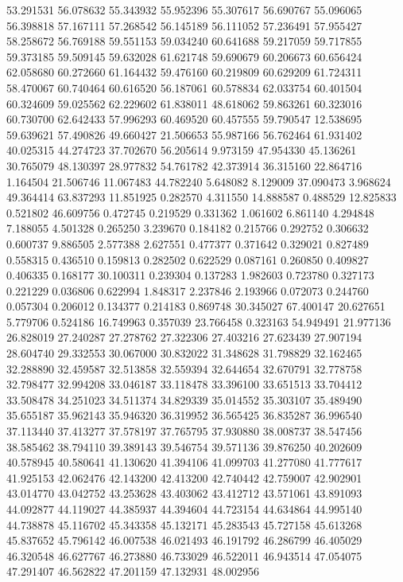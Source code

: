 53.291531
56.078632
55.343932
55.952396
55.307617
56.690767
55.096065
56.398818
57.167111
57.268542
56.145189
56.111052
57.236491
57.955427
58.258672
56.769188
59.551153
59.034240
60.641688
59.217059
59.717855
59.373185
59.509145
59.632028
61.621748
59.690679
60.206673
60.656424
62.058680
60.272660
61.164432
59.476160
60.219809
60.629209
61.724311
58.470067
60.740464
60.616520
56.187061
60.578834
62.033754
60.401504
60.324609
59.025562
62.229602
61.838011
48.618062
59.863261
60.323016
60.730700
62.642433
57.996293
60.469520
60.457555
59.790547
12.538695
59.639621
57.490826
49.660427
21.506653
55.987166
56.762464
61.931402
40.025315
44.274723
37.702670
56.205614
9.973159
47.954330
45.136261
30.765079
48.130397
28.977832
54.761782
42.373914
36.315160
22.864716
1.164504
21.506746
11.067483
44.782240
5.648082
8.129009
37.090473
3.968624
49.364414
63.837293
11.851925
0.282570
4.311550
14.888587
0.488529
12.825833
0.521802
46.609756
0.472745
0.219529
0.331362
1.061602
6.861140
4.294848
7.188055
4.501328
0.265250
3.239670
0.184182
0.215766
0.292752
0.306632
0.600737
9.886505
2.577388
2.627551
0.477377
0.371642
0.329021
0.827489
0.558315
0.436510
0.159813
0.282502
0.622529
0.087161
0.260850
0.409827
0.406335
0.168177
30.100311
0.239304
0.137283
1.982603
0.723780
0.327173
0.221229
0.036806
0.622994
1.848317
2.237846
2.193966
0.072073
0.244760
0.057304
0.206012
0.134377
0.214183
0.869748
30.345027
67.400147
20.627651
5.779706
0.524186
16.749963
0.357039
23.766458
0.323163
54.949491
21.977136
26.828019
27.240287
27.278762
27.322306
27.403216
27.623439
27.907194
28.604740
29.332553
30.067000
30.832022
31.348628
31.798829
32.162465
32.288890
32.459587
32.513858
32.559394
32.644654
32.670791
32.778758
32.798477
32.994208
33.046187
33.118478
33.396100
33.651513
33.704412
33.508478
34.251023
34.511374
34.829339
35.014552
35.303107
35.489490
35.655187
35.962143
35.946320
36.319952
36.565425
36.835287
36.996540
37.113440
37.413277
37.578197
37.765795
37.930880
38.008737
38.547456
38.585462
38.794110
39.389143
39.546754
39.571136
39.876250
40.202609
40.578945
40.580641
41.130620
41.394106
41.099703
41.277080
41.777617
41.925153
42.062476
42.143200
42.413200
42.740442
42.759007
42.902901
43.014770
43.042752
43.253628
43.403062
43.412712
43.571061
43.891093
44.092877
44.119027
44.385937
44.394604
44.723154
44.634864
44.995140
44.738878
45.116702
45.343358
45.132171
45.283543
45.727158
45.613268
45.837652
45.796142
46.007538
46.021493
46.191792
46.286799
46.405029
46.320548
46.627767
46.273880
46.733029
46.522011
46.943514
47.054075
47.291407
46.562822
47.201159
47.132931
48.002956
